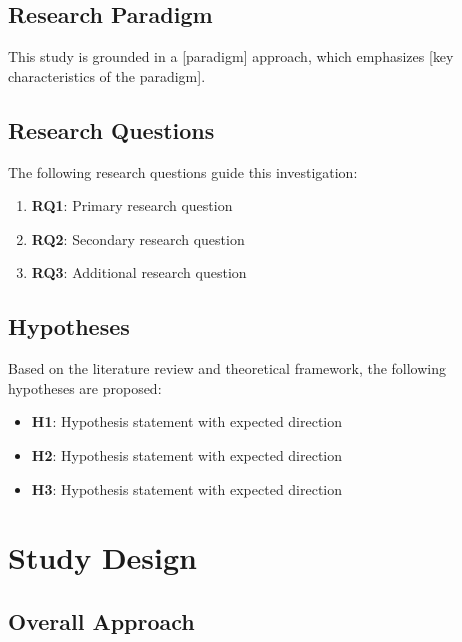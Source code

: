 \documentclass[
  12pt,
  letterpaper,
  12pt,
  letterpaper,
  oneside]{report}
\providecommand{\tightlist}{%
  \setlength{\itemsep}{0pt}\setlength{\parskip}{0pt}}
\begin{document}
\subsection{Research Paradigm}\label{research-paradigm}

This study is grounded in a {[}paradigm{]} approach, which emphasizes
{[}key characteristics of the paradigm{]}.

\subsection{Research Questions}\label{research-questions-1}

The following research questions guide this investigation:

\begin{enumerate}
\def\labelenumi{\arabic{enumi}.}
\tightlist
\item
  \textbf{RQ1}: Primary research question
\item
  \textbf{RQ2}: Secondary research question\\
\item
  \textbf{RQ3}: Additional research question
\end{enumerate}

\subsection{Hypotheses}\label{hypotheses}

Based on the literature review and theoretical framework, the following
hypotheses are proposed:

\begin{itemize}
\tightlist
\item
  \textbf{H1}: Hypothesis statement with expected direction
\item
  \textbf{H2}: Hypothesis statement with expected direction
\item
  \textbf{H3}: Hypothesis statement with expected direction
\end{itemize}

\section{Study Design}\label{study-design}

\subsection{Overall Approach}\label{overall-approach}
\end{document}
